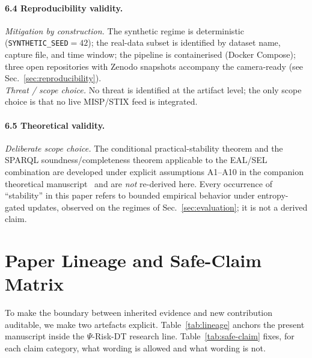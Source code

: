 \documentclass[runningheads]{llncs}
\newcommand{\psiop}{\ensuremath{\Psi}}
\begin{document}
\paragraph{6.4 Reproducibility validity.}
\emph{Mitigation by construction.} The synthetic regime is deterministic
(\texttt{SYNTHETIC\_SEED}$=42$); the real-data subset is identified by
dataset name, capture file, and time window; the pipeline is
containerised (Docker Compose); three open repositories with Zenodo
snapshots accompany the camera-ready (see
Sec.~\ref{sec:reproducibility}).\\
\emph{Threat / scope choice.} No threat is identified at the artifact
level; the only scope choice is that no live MISP/STIX feed is
integrated.

\paragraph{6.5 Theoretical validity.}
\emph{Deliberate scope choice.} The conditional practical-stability
theorem and the SPARQL soundness/completeness theorem applicable to the
EAL/SEL combination are developed under explicit assumptions A1--A10 in
the companion theoretical manuscript~\cite{paper5} and are \emph{not}
re-derived here. Every occurrence of ``stability'' in this paper refers
to bounded empirical behavior under entropy-gated updates, observed on
the regimes of Sec.~\ref{sec:evaluation}; it is not a derived claim.

\section{Paper Lineage and Safe-Claim Matrix}
\label{sec:lineage}

To make the boundary between inherited evidence and new contribution
auditable, we make two artefacts explicit. Table~\ref{tab:lineage}
anchors the present manuscript inside the $\psiop$-Risk-DT research
line. Table~\ref{tab:safe-claim} fixes, for each claim category, what
wording is allowed and what wording is not.
\end{document}
